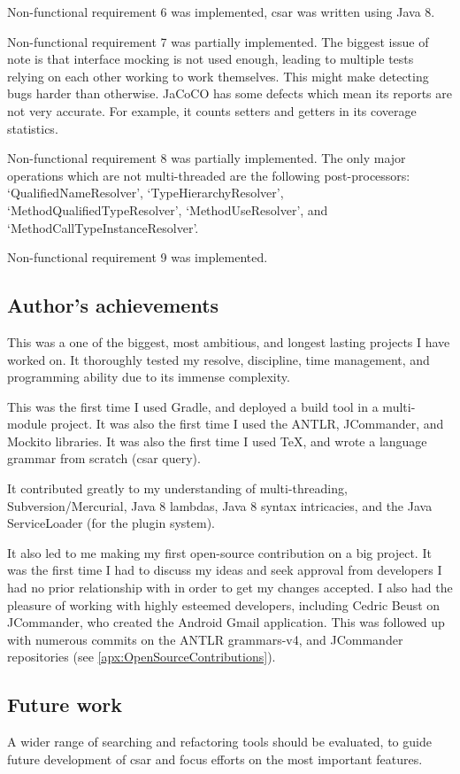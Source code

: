 \documentclass[12pt, letterpaper]{article}
\begin{document}
Non-functional requirement 6 was implemented, csar was written using Java 8.

Non-functional requirement 7 was partially implemented.
The biggest issue of note is that interface mocking is not used enough, leading to multiple tests relying on each other working to work themselves.
This might make detecting bugs harder than otherwise.
JaCoCO has some defects which mean its reports are not very accurate.
For example, it counts setters and getters in its coverage statistics.

Non-functional requirement 8 was partially implemented.
The only major operations which are not multi-threaded are the following post-processors: `QualifiedNameResolver', `TypeHierarchyResolver', `MethodQualifiedTypeResolver', `MethodUseResolver', and `MethodCallTypeInstanceResolver'.

Non-functional requirement 9 was implemented.

\subsection{Author's achievements}
This was a one of the biggest, most ambitious, and longest lasting projects I have worked on.
It thoroughly tested my resolve, discipline, time management, and programming ability due to its immense complexity.

This was the first time I used Gradle, and deployed a build tool in a multi-module project.
It was also the first time I used the ANTLR, JCommander, and Mockito libraries.
It was also the first time I used TeX, and wrote a language grammar from scratch (csar query).

It contributed greatly to my understanding of multi-threading, Subversion/Mercurial, Java 8 lambdas, Java 8 syntax intricacies, and the Java ServiceLoader (for the plugin system).

It also led to me making my first open-source contribution on a big project.
It was the first time I had to discuss my ideas and seek approval from developers I had no prior relationship with in order to get my changes accepted.
I also had the pleasure of working with highly esteemed developers, including Cedric Beust on JCommander, who created the Android Gmail application.
This was followed up with numerous commits on the ANTLR grammars-v4, and JCommander repositories (see \ref{apx:OpenSourceContributions}).

\subsection{Future work}
A wider range of searching and refactoring tools should be evaluated, to guide future development of csar and focus efforts on the most important features.
\end{document}
